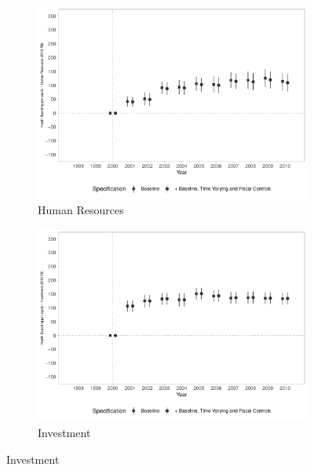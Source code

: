 \begin{figure}[h!]
    \begin{center}
    \caption{Effects on Public Health Spending per capita - By Type}\label{fig:7}
    \begin{subfigure}{0.48\textwidth}
        \centering
        \caption{\scriptsize Human Resources}\label{fig:7a}
        \includegraphics[width=\textwidth]{plots/siops_desppessoal_pcapita_dist_ec29_baseline_dist_ec29_baseline_7.pdf}
    \end{subfigure}
    \begin{subfigure}{0.48\textwidth}
        \centering
        \caption{\scriptsize Investment}\label{fig:7b}
        \includegraphics[width=\textwidth]{plots/siops_despinvest_pcapita_dist_ec29_baseline_dist_ec29_baseline_7.pdf}
    \end{subfigure}

\end{center}
\end{figure}
